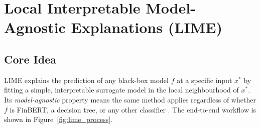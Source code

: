 \section{Local Interpretable Model-Agnostic Explanations (LIME)}

\subsection{Core Idea}

LIME \citep{ribeiro2016lime} explains the prediction of any black-box model $f$ at a
specific input $x^*$ by fitting a simple, interpretable surrogate model in the local
neighbourhood of $x^*$.
Its \emph{model-agnostic} property means the same method applies regardless of whether
$f$ is FinBERT, a decision tree, or any other classifier
\citep{doshivelez2017interpretable}.  The end-to-end workflow is shown in Figure~\ref{fig:lime_process}.

